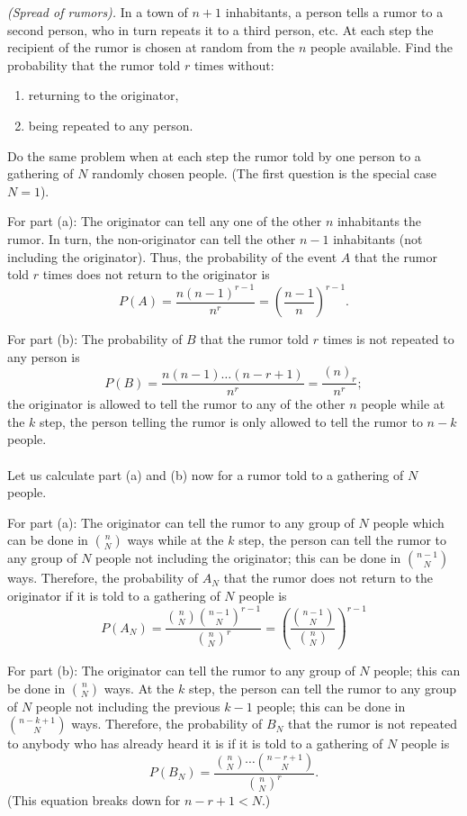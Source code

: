 \begin{problem}[Handout 2, \# 13]
  \emph{(Spread of rumors).} In a town of \(n+1\) inhabitants, a person
  tells a rumor to a second person, who in turn repeats it to a third
  person, etc. At each step the recipient of the rumor is chosen at random
  from the \(n\) people available. Find the probability that the rumor told
  \(r\) times without:
  \begin{enumerate}[label=(\alph*),noitemsep]
  \item returning to the originator,
  \item being repeated to any person.
  \end{enumerate}
  Do the same problem when at each step the rumor told by one person to a
  gathering of \(N\) randomly chosen people. (The first question is the
  special case \(N=1\)).
\end{problem}
\begin{solution*}
  For part (a): The originator can tell any one of the other \(n\)
  inhabitants the rumor. In turn, the non-originator can tell the other
  \(n-1\) inhabitants (not including the originator). Thus, the probability
  of the event \(A\) that the rumor told \(r\) times does not return to the
  originator is
  \[
    P(A)=\frac{n(n-1)^{r-1}}{n^r}=\left(\frac{n-1}{n}\right)^{r-1}.
  \]

  For part (b): The probability of \(B\) that the rumor told \(r\) times
  is not repeated to any person is
  \[
    P(B)=\frac{n(n-1)\dotsc(n-r+1)}{n^r}=\frac{(n)_r}{n^r};
  \]
  the originator is allowed to tell the rumor to any of the other \(n\)
  people while at the \(k\) step, the person telling the rumor
  is only allowed to tell the rumor to \(n-k\) people.
  \\\\
  Let us calculate part (a) and (b) now for a rumor told to a gathering of
  \(N\) people.

  For part (a): The originator can tell the rumor to any group of \(N\)
  people which can be done in \(\binom{n}{N}\) ways while at the
  \(k\) step, the person can tell the rumor to any group of
  \(N\) people not including the originator; this can be done in
  \(\binom{n-1}{N}\) ways. Therefore, the probability of \(A_N\) that the
  rumor does not return to the originator if it is told to a gathering of
  \(N\) people is
  \[
    P(A_N)=%
    \frac{\binom{n}{N}\binom{n-1}{N}^{r-1}}{\binom{n}{N}^r}=%
    \left(\frac{\binom{n-1}{N}}{\binom{n}{N}}\right)^{r-1}
  \]

  For part (b): The originator can tell the rumor to any group of \(N\)
  people; this can be done in \(\binom{n}{N}\) ways. At the
  \(k\) step, the person can tell the rumor to any group of
  \(N\) people not including the previous \(k-1\) people; this can be done
  in \(\binom{n-k+1}{N}\) ways. Therefore, the probability of \(B_N\) that
  the rumor is not repeated to anybody who has already heard it is if it is
  told to a gathering of \(N\) people is
  \[
    P(B_N)=\frac{\binom{n}{N}\dotsm\binom{n-r+1}{N}}{\binom{n}{N}^r}.
  \]
  (This equation breaks down for \(n-r+1<N\).)
\end{solution*}

